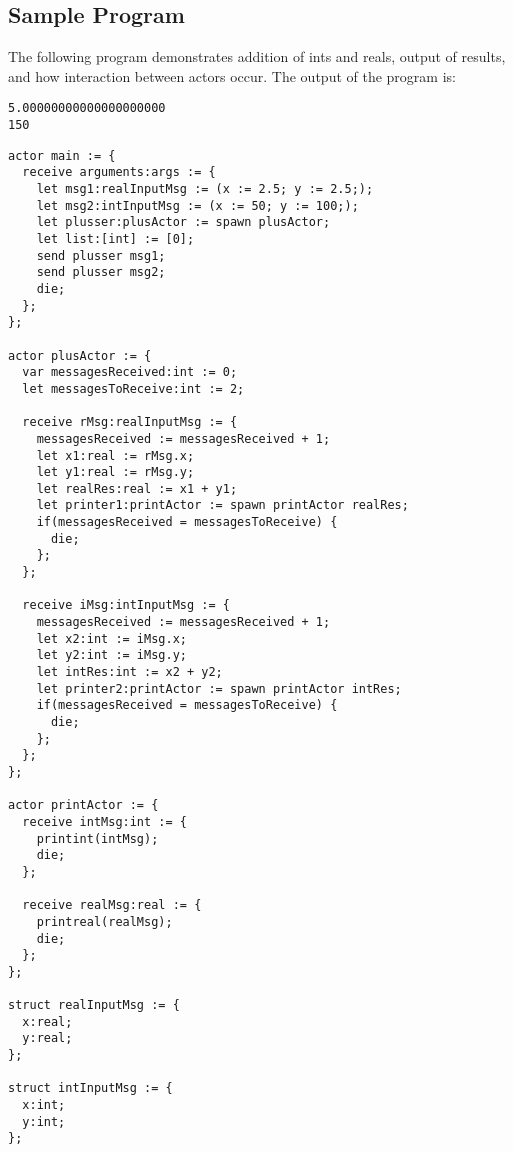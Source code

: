 \subsection{Sample Program}

The following program demonstrates addition of ints and reals, output of results, and how interaction between actors occur. The output of the program is:

\begin{verbatim}
5.00000000000000000000
150
\end{verbatim}

\begin{lstlisting}[style = TLDR,caption={Example program, able to be compiled by the compiler described in this report}]
actor main := {
  receive arguments:args := {
    let msg1:realInputMsg := (x := 2.5; y := 2.5;);
    let msg2:intInputMsg := (x := 50; y := 100;);
    let plusser:plusActor := spawn plusActor;
    let list:[int] := [0];
    send plusser msg1;
    send plusser msg2;
    die;
  };
};

actor plusActor := {
  var messagesReceived:int := 0;
  let messagesToReceive:int := 2;

  receive rMsg:realInputMsg := {
    messagesReceived := messagesReceived + 1;
    let x1:real := rMsg.x;
    let y1:real := rMsg.y;
    let realRes:real := x1 + y1;
    let printer1:printActor := spawn printActor realRes;
    if(messagesReceived = messagesToReceive) { 
      die;
    };
  };

  receive iMsg:intInputMsg := {
    messagesReceived := messagesReceived + 1;
    let x2:int := iMsg.x;
    let y2:int := iMsg.y;
    let intRes:int := x2 + y2;
    let printer2:printActor := spawn printActor intRes;
    if(messagesReceived = messagesToReceive) { 
      die;
    };
  };
};

actor printActor := {
  receive intMsg:int := {
    printint(intMsg);
    die;
  };

  receive realMsg:real := {
    printreal(realMsg);
    die;
  };
};

struct realInputMsg := {
  x:real;
  y:real;
};

struct intInputMsg := {
  x:int;
  y:int;
};
\end{lstlisting}
